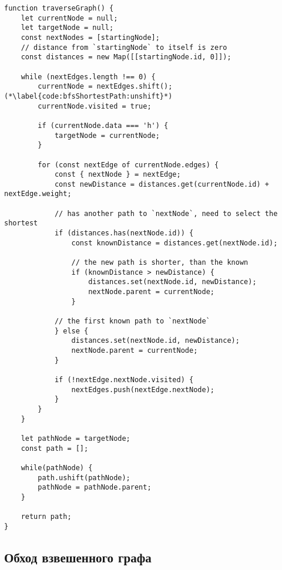 \documentclass[../article.tex]{subfiles}
\begin{document}
\begin{figure*}
    \begin{ruledelement}
        \begin{lstlisting}[caption={Первый подход к поиску кратчайшего пути}, label={lst:bfsShortestPath}]
function traverseGraph() {
    let currentNode = null;
    let targetNode = null;
    const nextNodes = [startingNode];
    // distance from `startingNode` to itself is zero
    const distances = new Map([[startingNode.id, 0]]);

    while (nextEdges.length !== 0) {
        currentNode = nextEdges.shift(); (*\label{code:bfsShortestPath:unshift}*)
        currentNode.visited = true;

        if (currentNode.data === 'h') {
            targetNode = currentNode;
        }

        for (const nextEdge of currentNode.edges) {
            const { nextNode } = nextEdge;
            const newDistance = distances.get(currentNode.id) + nextEdge.weight;

            // has another path to `nextNode`, need to select the shortest
            if (distances.has(nextNode.id)) {
                const knownDistance = distances.get(nextNode.id);

                // the new path is shorter, than the known
                if (knownDistance > newDistance) {
                    distances.set(nextNode.id, newDistance);
                    nextNode.parent = currentNode;
                }

            // the first known path to `nextNode`
            } else {
                distances.set(nextNode.id, newDistance);
                nextNode.parent = currentNode;
            }

            if (!nextEdge.nextNode.visited) {
                nextEdges.push(nextEdge.nextNode);
            }
        }
    }

    let pathNode = targetNode;
    const path = [];

    while(pathNode) {
        path.ushift(pathNode);
        pathNode = pathNode.parent;
    }

    return path;
}
        \end{lstlisting}
    \end{ruledelement}

\end{figure*}

\subsection{Обход взвешенного графа}
\end{document}
